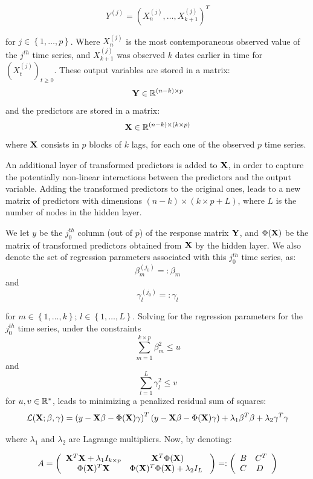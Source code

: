\begin{equation}
Y^{(j)} = \left(X^{(j)}_n, \ldots, X^{(j)}_{k+1} \right)^T
\end{equation}

for $j \in \left\lbrace 1, \ldots,
p \right\rbrace$. Where $X^{(j)}_n$ is the most contemporaneous observed value
of the $j^{th}$ time series, and $X^{(j)}_{k+1}$ was observed $k$ dates earlier
in time for $(X^{(j)}_t)_{t \geq 0}$. These output variables are stored in a
matrix: $$ {\bf Y} \in \mathbb{R}^{(n-k) \times p} $$ and the predictors are
stored in a matrix: $$ {\bf X} \in \mathbb{R}^{(n-k) \times (k \times p)} $$
where ${\bf X}$ consists in $p$ blocks of $k$ lags, for each one of the observed
$p$ time series.

\medskip

An additional layer of transformed  predictors
is added to ${\bf X}$, in order to capture the potentially non-linear
interactions between the predictors and the output variable. Adding the transformed predictors to the original ones, leads to a new matrix of predictors with dimensions $(n-k) \times (k \times p + L)$, where $L$ is the number of nodes in the hidden layer.

\medskip

We let $y$ be the $j_0^{th}$ column (out of $p$) of the response matrix ${\bf Y}$, and $\Phi({\bf X})$ be the matrix of transformed predictors obtained from ${\bf X}$ by the hidden layer. We also denote the set of regression parameters associated with this $j_0^{th}$ time series, as:
$$
\beta_m^{(j_0)} =: \beta_m
$$
and
$$
\gamma_l^{(j_0)} =: \gamma_l
$$

for $m \in \left\lbrace 1, \ldots, k \right\rbrace$; $l \in \left\lbrace 1, \ldots,  L\right\rbrace$. Solving for the regression parameters for the $j_0^{th}$ time series, under the constraints
$$
\sum_{m=1}^{k\times p} \beta_m^2 \leq u
$$
and
$$
\sum_{l=1}^L \gamma_l^2 \leq v
$$
for $u, v \in \mathbb{R}^*$, leads to minimizing a penalized residual sum of squares:
$$
\mathcal{L}({\bf X}; \beta, \gamma) = \left(y - {\bf X}\beta -
\Phi({\bf X})\gamma\right)^T\left(y - {\bf X}\beta - \Phi({\bf X})\gamma\right) + \lambda_1
\beta^T \beta + \lambda_2 \gamma^T\gamma
$$

\medskip

where $\lambda_1$ and $\lambda_2$ are Lagrange multipliers. Now, by denoting:

$$ A = \left( {\begin{array}{cc} {\bf X}^T{\bf X} + \lambda_1 I_{k\times p} &  {\bf X}^T\Phi({\bf X})\\
\Phi({\bf X})^T{\bf X} & \Phi({\bf X})^T\Phi({\bf X}) + \lambda_2 I_{L} \      \end{array} } \right) =:
\left( {\begin{array}{cc} B &  C^T\\ C & D \      \end{array} } \right) $$

